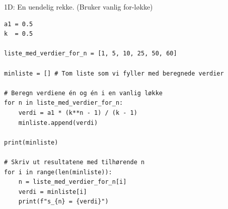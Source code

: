 \cyanheader
\begin{frame}[fragile]{1D: En uendelig rekke. (Bruker vanlig for-løkke)}
\begin{verbatim}
a1 = 0.5
k  = 0.5

liste_med_verdier_for_n = [1, 5, 10, 25, 50, 60]

minliste = [] # Tom liste som vi fyller med beregnede verdier

# Beregn verdiene én og én i en vanlig løkke
for n in liste_med_verdier_for_n:
    verdi = a1 * (k**n - 1) / (k - 1)
    minliste.append(verdi)

print(minliste)

# Skriv ut resultatene med tilhørende n
for i in range(len(minliste)):
    n = liste_med_verdier_for_n[i]
    verdi = minliste[i]
    print(f"s_{n} = {verdi}")

\end{verbatim}
\medskip
\end{frame}

